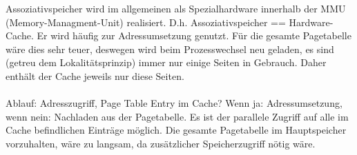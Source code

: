 \begin{answer}
  Assoziativspeicher wird im allgemeinen als Spezialhardware innerhalb der MMU (Memory-Managment-Unit) realisiert. D.h. Assoziativspeicher == Hardware-Cache.
  Er wird häufig zur Adressumsetzung genutzt. Für die gesamte Pagetabelle wäre dies sehr teuer, deswegen wird beim Prozesswechsel neu geladen, es sind (getreu dem Lokalitätsprinzip) immer nur einige Seiten in Gebrauch. Daher enthält der Cache jeweils nur diese Seiten.

  \paragraph*{}
  Ablauf: Adresszugriff,
  Page Table Entry im Cache? Wenn ja: Adressumsetzung, wenn nein: Nachladen aus der Pagetabelle.
  Es ist der parallele Zugriff auf alle im Cache befindlichen Einträge möglich. Die gesamte Pagetabelle im Hauptspeicher vorzuhalten, wäre zu langsam, da zusätzlicher Speicherzugriff nötig wäre.
\end{answer}

